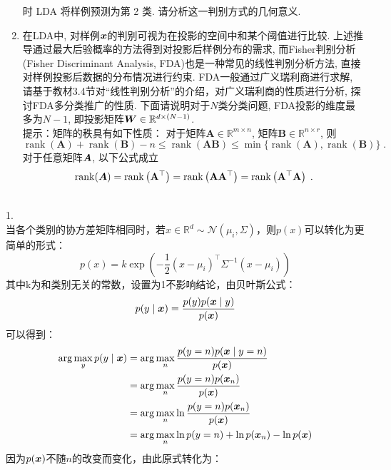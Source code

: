 \documentclass[answers]{exam}  %
\begin{document}
\begin{questions}
\begin{enumerate}
\begin{equation}
	\end{equation}时 LDA 将样例预测为第 2 类. 请分析这一判别方式的几何意义.
	\item 在LDA中, 对样例$\vx$的判别可视为在投影的空间中和某个阈值进行比较. 上述推导通过最大后验概率的方法得到对投影后样例分布的需求, 而Fisher判别分析 (Fisher Discriminant Analysis, FDA)也是一种常见的线性判别分析方法, 直接对样例投影后数据的分布情况进行约束. 
FDA一般通过广义瑞利商进行求解, 请基于教材3.4节对“线性判别分析”的介绍，对广义瑞利商的性质进行分析, 探讨FDA多分类推广的性质.
下面请说明对于$N$类分类问题, FDA投影的维度最多为$N-1$, 即投影矩阵$\mW\in\mathbb{R}^{d\times (N-1)}$.\\
    提示：矩阵的秩具有如下性质：
    对于矩阵$\mathbf{A}\in\mathbb{R}^{m \times n}$, 矩阵$\mathbf{B}\in\mathbb{R}^{n \times r}$, 则
    \begin{equation}
        \operatorname{rank}(\mathbf{A})+\operatorname{rank}(\mathbf{B})-n \leq \operatorname{rank}(\mathbf{A B}) \leq \min \{\operatorname{rank}(\mathbf{A}), \operatorname{rank}(\mathbf{B})\}\;.
    \end{equation}
    对于任意矩阵$\mA$, 以下公式成立
    \begin{equation}
    \operatorname{rank}(\boldsymbol{A})=\operatorname{rank}\left(\mathbf{A}^{\top}\right)=\operatorname{rank}\left(\mathbf{A} \mathbf{A}^{\top}\right)=\operatorname{rank}\left(\mathbf{A}^{\top} \mathbf{A}\right)\;.
    \end{equation}
\end{enumerate}
	\begin{solution}
	    \\1.\\
		当各个类别的协方差矩阵相同时，若$x\in\mathbb R^d\sim \mathcal N(\mu_i,\Sigma)$，则$p(x)$可以转化为更简单的形式：
		$$p(x)=k\exp\left( -\frac12(x-\mu_i)^\top\Sigma^{-1}(x-\mu_i) \right)$$
		其中k为和类别无关的常数，设置为1不影响结论，由贝叶斯公式：
		$$p(y\mid \vx)=\frac{p(y)p(\vx\mid y)}{p(\vx)}$$
		可以得到：
		$$\begin{aligned}
			\arg\max_y p(y\mid\vx)
			&=\arg\max_n \frac{p(y=n)p(\vx\mid y=n)}{p(\vx)}\\
			&=\arg\max_n \frac{p(y=n)p(\vx_n)}{p(\vx)}\\
			&=\arg\max_n\ln\frac{p(y=n)p(\vx_n)}{p(\vx)}\\
			&=\arg\max_n\ln p(y=n)+\ln p (\vx_n)-\ln p(\vx)\\
		\end{aligned}$$
		因为$p(\vx)$不随$n$的改变而变化，由此原式转化为：
		$$\begin{aligned}

\end{aligned}$$
\end{solution}
\end{questions}
\end{document}
